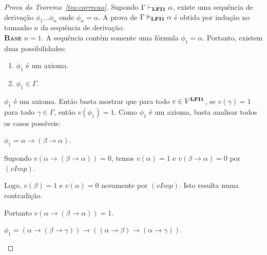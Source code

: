     \begin{proof}[Prova do Teorema~\ref{teo:correcao}]
        Supondo $\Gamma \vdash_{{\normalfont\textbf{LFI1}}{}} \alpha$, existe uma sequência de derivação $\phi_{1} \ldots \phi_{n}$ onde $\phi_{n} = \alpha$. A prova de $\Gamma \vDash_{{\normalfont\textbf{LFI1}}{}} \alpha$ é obtida por indução no tamanho $n$ da sequência de derivação:\\

        \noindent \textbf{\textsc{Base}} $n = 1$. A sequência contém somente uma fórmula $\phi_{1} = \alpha$. Portanto, existem duas possibilidades:
        \begin{enumerate}
            \item $\phi_{1}$ é um axioma.
            \item $\phi_{1} \in \Gamma$.
        \end{enumerate}
        

            \newcommand{\subcaso}{\refstepcounter{subcasosUm}\item[Subcaso 1.\thesubcasosUm{}.]}
        

        \begin{provaporcasos}
            
            \casodeprova{} $\phi_{1}$ é um axioma. Então basta mostrar que para todo $v \in V^{{\normalfont\textbf{LFI1}}{}}$, se $v(\gamma) = 1$ para todo $\gamma \in \Gamma$, então $v(\phi_{1}) = 1$. Como $\phi_{1}$ é um axioma, basta analisar todos os casos possíveis:

            \begin{provaporsubcasos}
                
                \subcasodeprova{} $\phi_{1} = \alpha \to (\beta \to \alpha)$.

                    Supondo $v(\alpha \to (\beta \to \alpha)) = 0$, temos $v(\alpha) = 1$ e $v(\beta \to \alpha) = 0$ por $(vImp)$. 
                        
                    Logo, $v(\beta) = 1$ e $v(\alpha) = 0$ novamente por $(vImp)$. Isto resulta numa contradição. 
                    
                    Portanto $v(\alpha \to (\beta \to \alpha)) = 1$.

                \subcasodeprova{} $\phi_{1} = (\alpha \to (\beta \to \gamma)) \to ((\alpha \to \beta) \to (\alpha \to \gamma ))$.
                

\end{provaporsubcasos}
\end{provaporcasos}
\end{proof}
